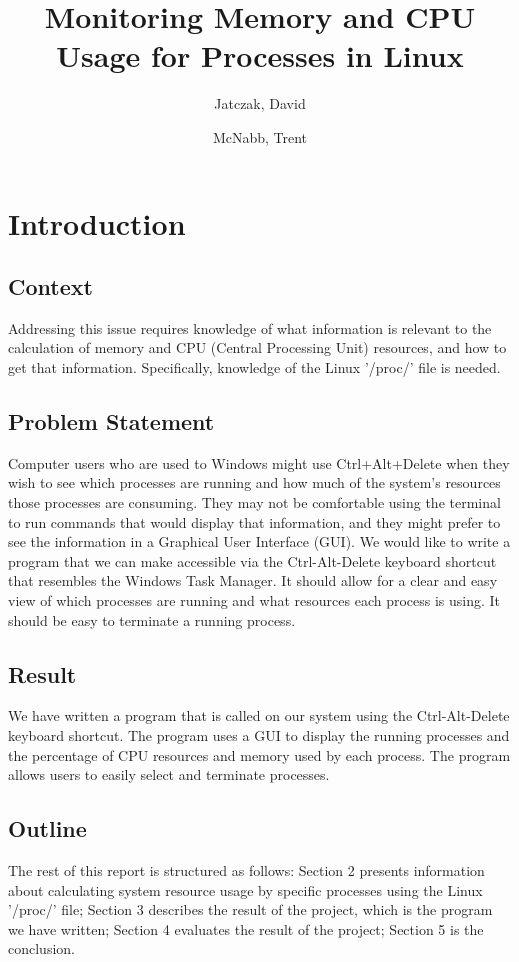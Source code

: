 \documentclass[12pt]{article}
\title{Monitoring Memory and CPU Usage for Processes in Linux}
\author{Jatczak, David \and McNabb, Trent}
\begin{document}
	
	\maketitle
	
	\section{Introduction}
	
	\subsection{Context}
	Addressing this issue requires knowledge of what information is relevant to the calculation of memory and CPU (Central Processing Unit) resources, and how to get that information. Specifically, knowledge of the Linux '/proc/' file is needed.
	
	\subsection{Problem Statement}
	Computer users who are used to Windows might use Ctrl+Alt+Delete when they wish to see which processes are running and how much of the system's resources those processes are consuming. They may not be comfortable using the terminal to run commands that would display that information, and they might prefer to see the information in a Graphical User Interface (GUI). We would like to write a program that we can make accessible via the Ctrl-Alt-Delete keyboard shortcut that resembles the Windows Task Manager. It should allow for a clear and easy view of which processes are running and what resources each process is using. It should be easy to terminate a running process.
	
	\subsection{Result}
	We have written a program that is called on our system using the Ctrl-Alt-Delete keyboard shortcut. The program uses a GUI to display the running processes and the percentage of CPU resources and memory used by each process. The program allows users to easily select and terminate processes.
	
	\subsection{Outline}
	The rest of this report is structured as follows: Section 2 presents information about calculating system resource usage by specific processes using the Linux '/proc/' file; Section 3 describes the result of the project, which is the program we have written; Section 4 evaluates the result of the project; Section 5 is the conclusion.
	
\end{document}
